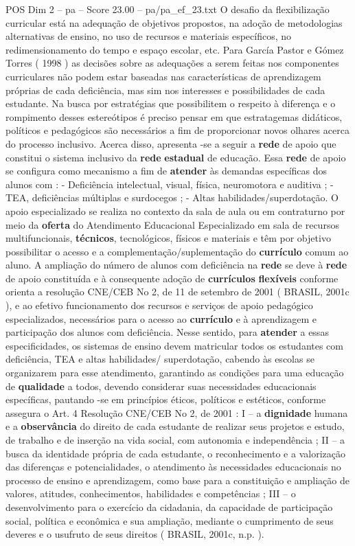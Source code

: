 \begin{textsample}{POS Dim 2 – pa – Score 23.00 – pa/pa\_ef\_23.txt}
O desafio da flexibilização curricular está na adequação de objetivos propostos, na adoção de metodologias alternativas de ensino, no uso de recursos e materiais específicos, no redimensionamento do tempo e espaço escolar, etc.
Para García Pastor e Gómez Torres ( 1998 ) as decisões sobre as adequações a serem feitas nos componentes curriculares não podem estar baseadas nas características de aprendizagem próprias de cada deficiência, mas sim nos interesses e possibilidades de cada estudante.
Na busca por estratégias que possibilitem o respeito à diferença e o rompimento desses estereótipos é preciso pensar em que estratagemas didáticos, políticos e pedagógicos são necessários a fim de proporcionar novos olhares acerca do processo inclusivo.
Acerca disso, apresenta -se a seguir a \textbf{rede} de apoio que constitui o sistema inclusivo da \textbf{rede} \textbf{estadual} de educação.
Essa \textbf{rede} de apoio se configura como mecanismo a fim de \textbf{atender} às demandas específicas dos alunos com : - Deficiência intelectual, visual, física, neuromotora e auditiva ; - TEA, deficiências múltiplas e surdocegos ; - Altas habilidades/superdotação.
O apoio especializado se realiza no contexto da sala de aula ou em contraturno por meio da \textbf{oferta} do Atendimento Educacional Especializado em sala de recursos multifuncionais, \textbf{técnicos}, tecnológicos, físicos e materiais e têm por objetivo possibilitar o acesso e a complementação/suplementação do \textbf{currículo} comum ao aluno.
A ampliação do número de alunos com deficiência na \textbf{rede} se deve à \textbf{rede} de apoio constituída e à consequente adoção de \textbf{currículos} \textbf{flexíveis} conforme orienta a resolução CNE/CEB No 2, de 11 de setembro de 2001 ( BRASIL, 2001c ), e ao efetivo funcionamento dos recursos e serviços de apoio pedagógico especializados, necessários para o acesso ao \textbf{currículo} e à aprendizagem e participação dos alunos com deficiência.
Nesse sentido, para \textbf{atender} a essas especificidades, os sistemas de ensino devem matricular todos os estudantes com deficiência, TEA e altas habilidades/ superdotação, cabendo às escolas se organizarem para esse atendimento, garantindo as condições para uma educação de \textbf{qualidade} a todos, devendo considerar suas necessidades educacionais específicas, pautando -se em princípios éticos, políticos e estéticos, conforme assegura o Art. 4 Resolução CNE/CEB No 2, de 2001 : I – a \textbf{dignidade} humana e a \textbf{observância} do direito de cada estudante de realizar seus projetos e estudo, de trabalho e de inserção na vida social, com autonomia e independência ; II – a busca da identidade própria de cada estudante, o reconhecimento e a valorização das diferenças e potencialidades, o atendimento às necessidades educacionais no processo de ensino e aprendizagem, como base para a constituição e ampliação de valores, atitudes, conhecimentos, habilidades e competências ; III – o desenvolvimento para o exercício da cidadania, da capacidade de participação social, política e econômica e sua ampliação, mediante o cumprimento de seus deveres e o usufruto de seus direitos ( BRASIL, 2001c, n.p. ).

\end{textsample}

